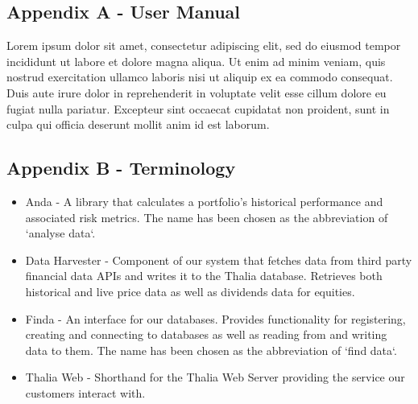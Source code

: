 \documentclass[main.tex]{subfiles}
\begin{document}
\subsection{Appendix A - User Manual}
\label{UserManual}
Lorem ipsum dolor sit amet, consectetur adipiscing elit, sed do eiusmod tempor incididunt ut labore et dolore magna aliqua. Ut enim ad minim veniam, quis nostrud exercitation ullamco laboris nisi ut aliquip ex ea commodo consequat. Duis aute irure dolor in reprehenderit in voluptate velit esse cillum dolore eu fugiat nulla pariatur. Excepteur sint occaecat cupidatat non proident, sunt in culpa qui officia deserunt mollit anim id est laborum.

\subsection{Appendix B - Terminology}
\label{Terminology}

\begin{itemize}
    \item Anda - A library that calculates a portfolio's historical performance and associated risk metrics. The name has been chosen as the abbreviation of `analyse data`.
    \item Data Harvester - Component of our system that fetches data from third party financial data APIs and writes it to the Thalia database. Retrieves both historical and live price data as well as dividends data for equities.
    \item Finda - An interface for our databases. Provides functionality for registering, creating and connecting to databases as well as reading from and writing data to them. The name has been chosen as the abbreviation of `find data`.
    \item Thalia Web - Shorthand for the Thalia Web Server providing the service our customers interact with.
\end{itemize}
\end{document}
